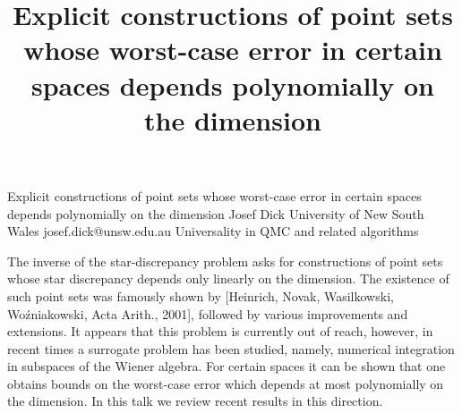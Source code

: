 \documentclass{article}
\title{Explicit constructions of point sets whose worst-case error in certain spaces depends polynomially on the dimension}
\author{}
\date{}
\begin{document}
\begin{talk}
  {Explicit constructions of point sets whose worst-case error in certain spaces depends polynomially on the dimension}%
  {Josef Dick}%
  {University of New South Wales}%
  {josef.dick@unsw.edu.au}%
  {}%
{Universality in QMC and related algorithms} %


The inverse of the star-discrepancy problem asks for constructions of point sets whose star discrepancy depends only linearly on the dimension. The existence of such point sets was famously shown by [Heinrich, Novak, Wasilkowski, Wo\'zniakowski, Acta Arith., 2001], followed by various improvements and extensions. It appears that this problem is currently out of reach, however, in recent times a surrogate problem has been studied, namely, numerical integration in subspaces of the Wiener algebra. For certain spaces it can be shown that one obtains bounds on the worst-case error which depends at most polynomially on the dimension. In this talk we review recent results in this direction.

\end{talk}
\end{document}
